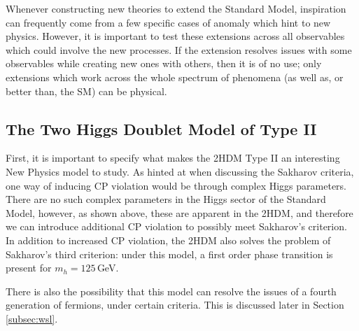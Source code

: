 \documentclass[a4paper,12pt]{article}
\begin{document}
Whenever constructing new theories to extend the Standard Model, inspiration can frequently come from a few specific cases of anomaly which hint to new physics. 
However, it is important to test these extensions across all observables which could involve the new processes.
If the extension resolves issues with some observables while creating new ones with others, then it is of no use; only extensions which work across the whole spectrum of phenomena (as well as, or better than, the SM) can be physical. 

\subsection{The Two Higgs Doublet Model of Type II}
\label{subsec:2hdm}
First, it is important to specify what makes the 2HDM Type II an interesting New Physics model to study. 
As hinted at when discussing the Sakharov criteria, one way of inducing CP violation would be through complex Higgs parameters. 
There are no such complex parameters in the Higgs sector of the Standard Model, however, as shown above, these are apparent in the 2HDM, and therefore we can introduce additional CP violation to possibly meet Sakharov's criterion. 
In addition to increased CP violation, the 2HDM also solves the problem of Sakharov's third criterion: under this model, a first order phase transition is present for $m_h=125\,$GeV. 

There is also the possibility that this model can resolve the issues of a fourth generation of fermions, under certain criteria. 
This is discussed later in Section \ref{subsec:wsl}.
\end{document}
